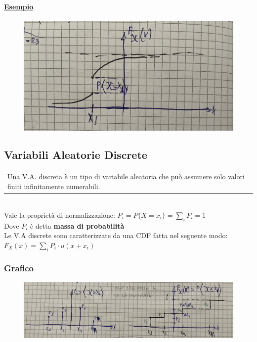 \documentclass{article}
\begin{document}
\begin{enumerate}
    \paragraph{\underline{Esempio}}
    \begin{figure}[ht]
    \centering
    \includegraphics[scale=0.12]{images/30.prop6CDF.jpeg}
    \end{figure}
\end{enumerate}

\subsection{Variabili Aleatorie Discrete}
\begin{tabular}{|p{13cm}}
Una V.A. discreta è un tipo di variabile aleatoria che può assumere solo valori finiti infinitamente numerabili.
\end{tabular} \\
Vale la proprietà di normalizzazione: $P_i = P\big\{ X = x_i \big\} = \sum_i P_i = 1$ \\
Dove $P_i$ è detta \textbf{massa di probabilità} \\
Le V.A discrete sono caratterizzate da una CDF fatta nel seguente modo: $F_X(x) = \sum_i P_i \cdot u(x+x_i)$
\subsubsection{\underline{Grafico}}
\begin{figure}[ht]
\centering
\includegraphics[scale=0.12]{images/31.VA_Discrete.jpeg}
\end{figure}
\newpage
\end{document}
